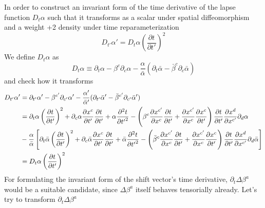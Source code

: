 \documentclass[letterpaper,nofootinbib,prd,amsmath,onecolumn]{revtex4-1}
\begin{document}
In order to construct an invariant form of the time derivative of the lapse function $D_{t}\alpha$ such that it transforms as a scalar under spatial diffeomorphism and a weight +2 density under time reparameterization
\[
D_{t'}\alpha' = D_{t}\alpha\left(\frac{\partial t}{\partial t'}\right)^{2}
\]
We define $D_{t}\alpha$ as
\begin{equation}
D_{t}\alpha \equiv \partial_{t}\alpha - \beta^{c}\partial_{c}\alpha - \frac{\alpha}{{\bar \alpha}}(\partial_{t}{\bar \alpha} - {\bar \beta}^{c}\partial_{c}{\bar \alpha})
\end{equation}
and check how it transforms
\begin{align}
D_{t'}\alpha' & = \partial_{t'}\alpha' - \beta^{c'}\partial_{c'}\alpha' - \frac{\alpha'}{{\bar \alpha}'}(\partial_{t'}{\bar \alpha}' - {\bar \beta}^{c'}\partial_{c'}{\bar \alpha}')\notag\\
& = \partial_{t}\alpha\left(\frac{\partial t}{\partial t'}\right)^{2} + \partial_{c}\alpha\frac{\partial x^{c}}{\partial t'}\frac{\partial t}{\partial t'} + \alpha\frac{\partial^{2}t}{\partial {t'}^{2}} - \left(\beta^{c}\frac{\partial x^{c'}}{\partial x^{c}}\frac{\partial t}{\partial t'} + \frac{\partial x^{c'}}{\partial x^{c}}\frac{\partial x^{c}}{\partial t'}\right)\frac{\partial t}{\partial t'}\frac{\partial x^{d}}{\partial x^{c'}}\partial_{d}\alpha\notag\\
& - \frac{\alpha}{{\bar \alpha}}\left[\partial_{t}{\bar \alpha}\left(\frac{\partial t}{\partial t'}\right)^{2} + \partial_{c}{\bar \alpha}\frac{\partial x^{c}}{\partial t'}\frac{\partial t}{\partial t'} + {\bar \alpha}\frac{\partial^{2}t}{\partial {t'}^{2}} - \left({\bar\beta}^{c}\frac{\partial x^{c'}}{\partial x^{c}}\frac{\partial t}{\partial t'} + \frac{\partial x^{c'}}{\partial x^{c}}\frac{\partial x^{c}}{\partial t'}\right)\frac{\partial t}{\partial t'}\frac{\partial x^{d}}{\partial x^{c'}}\partial_{d}{\bar\alpha}\right]\notag\\
& = D_{t}\alpha\left(\frac{\partial t}{\partial t'}\right)^{2}
\end{align}
For formulating the invariant form of the shift vector's time derivative, $\partial_{t}\Delta \beta^{a}$ would be a suitable candidate, since $\Delta \beta^{a}$ itself behaves tensorially already. Let's try to transform $\partial_{t} \Delta \beta^{a}$
\end{document}

